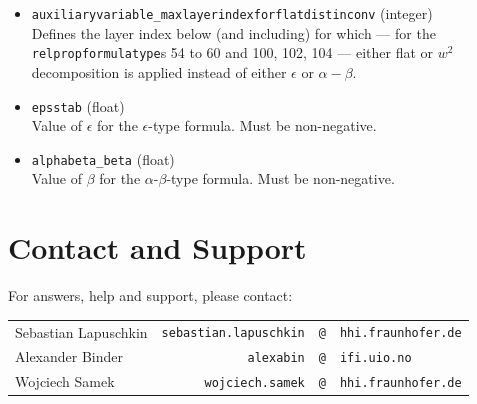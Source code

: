 \documentclass[a4wide]{article}
\begin{document}
\begin{itemize}
\item \texttt{auxiliaryvariable\_maxlayerindexforflatdistinconv} (integer) \\
Defines the layer index below (and including) for which ---  for the  \texttt{relpropformulatype}s 54 to 60 and 100, 102, 104 --- either flat or $w^2$ decomposition is applied instead of either $\epsilon$ or $\alpha-\beta$.

\item \texttt{epsstab} (float) \\
Value of $\epsilon$ for the $\epsilon$-type formula. Must be non-negative.

\item \texttt{alphabeta\_beta} (float) \\
Value of $\beta$ for the $\alpha$-$\beta$-type formula. Must be non-negative.


\end{itemize}









\section{Contact and Support}
\label{sec:contact}

For answers, help and support, please contact:\\
\begin{tabular}{lrcl}
Sebastian Lapuschkin  & \texttt{sebastian.lapuschkin} & \hspace{-5mm} \texttt{@} & \hspace{-5mm} \texttt{hhi.fraunhofer.de}\\
Alexander Binder  & \texttt{alexabin} & \hspace{-5mm} \texttt{@} & \hspace{-5mm} \texttt{ifi.uio.no}\\
Wojciech Samek  & \texttt{wojciech.samek} & \hspace{-5mm} \texttt{@} & \hspace{-5mm} \texttt{hhi.fraunhofer.de}
\end{tabular}




\end{document}
